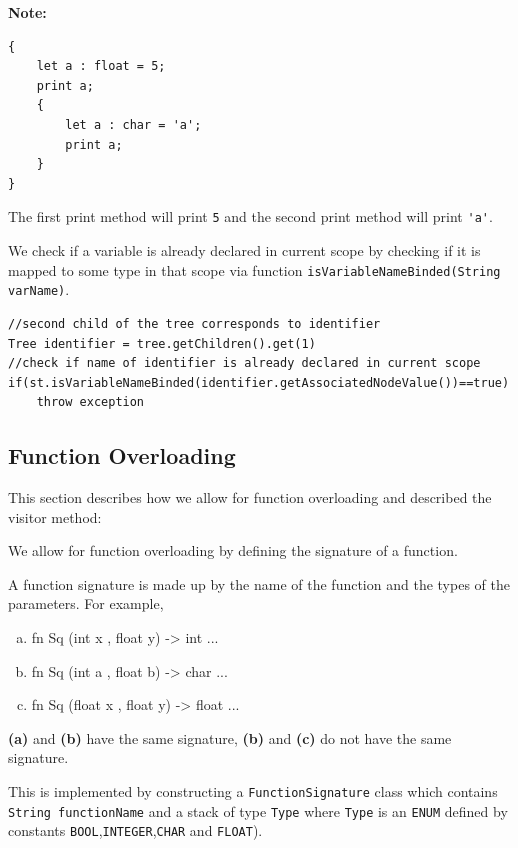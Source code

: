 \textbf{Note:}
\begin{lstlisting}[caption=The same variable name can be used in different scopes]
{
    let a : float = 5;
    print a;
    {
        let a : char = 'a'; 
        print a;
    }
}
\end{lstlisting}
The first print method will print \verb!5! and the second print method will print \verb!'a'!.




We check if a variable is already declared in current scope by checking if it is mapped to some type in that scope via function \verb!isVariableNameBinded(String varName)!. 

\begin{lstlisting}[caption=PSUEDOCODE : checking if a variable is already declared in currentScope (in method visitVariableDeclarationNode(Tree tree)) ]
//second child of the tree corresponds to identifier
Tree identifier = tree.getChildren().get(1)
//check if name of identifier is already declared in current scope
if(st.isVariableNameBinded(identifier.getAssociatedNodeValue())==true)
    throw exception
\end{lstlisting}

\subsection{Function Overloading}

This section describes how we allow for function overloading and described the visitor method: 



We allow for function overloading by defining the signature of a function.

A function signature is made up by the name of the function and the types of the parameters. For example,
\begin{enumerate}[(a)]
	\item fn Sq (int x , float y) -> int  {...}
	\item  fn Sq (int a , float b) -> char {...}
	\item fn Sq (float x , float y) -> float {...}
\end{enumerate}

\textbf{(a)} and \textbf{(b)} have the same signature, \textbf{(b)} and \textbf{(c)} do not have the same signature.

This is implemented by constructing a \verb!FunctionSignature! class which contains \verb!String functionName! and a stack of type \verb!Type! where \verb!Type! is an \verb!ENUM! defined by constants \verb!BOOL!,\verb!INTEGER!,\verb!CHAR! and \verb!FLOAT!).

